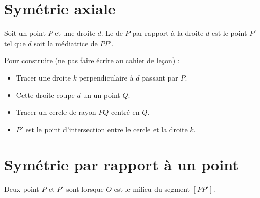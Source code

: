 


\section{Symétrie axiale}

\begin{definition}
    Soit un point \( P\) et une droite \( d\). Le  de \( P\) par rapport à la droite \( d\) est le point \( P'\) tel que \( d\) soit la médiatrice de \( PP'\).
\end{definition}

Pour construire (ne pas faire écrire au cahier de leçon) :
\begin{itemize}
    \item Tracer une droite \( k\) perpendiculaire à \( d\) passant par \( P\).
    \item Cette droite coupe \( d\) un un point \( Q\).
    \item Tracer un cercle de rayon \( PQ\) centré en \( Q\).
    \item \( P'\) est le point d'intersection entre le cercle et la droite \( k\).
\end{itemize}

\section{Symétrie par rapport à un point}



\begin{definition}
    Deux point \( P\) et \( P'\) sont  lorsque \( O\) est le milieu du segment \( [PP']\). 
\end{definition}

